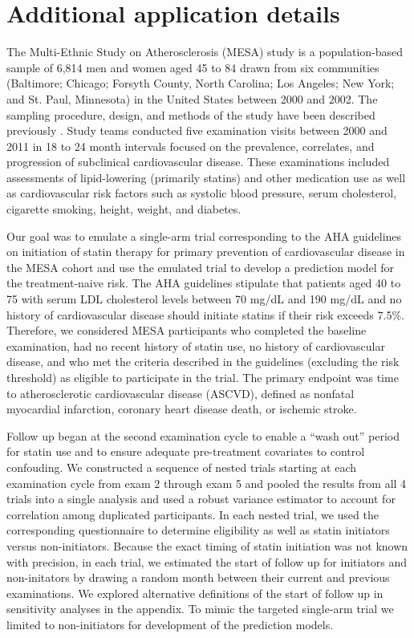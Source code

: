\section{Additional application details}
The Multi-Ethnic Study on Atherosclerosis (MESA) study is a population-based sample of 6,814 men and women aged 45 to 84 drawn from six communities (Baltimore; Chicago; Forsyth County, North Carolina; Los Angeles; New York; and St. Paul, Minnesota) in the United States between 2000 and 2002. The sampling procedure, design, and methods of the study have been described previously \cite{bild_multi-ethnic_2002}. Study teams conducted five examination visits between 2000 and 2011 in 18 to 24 month intervals focused on the prevalence, correlates, and progression of subclinical cardiovascular disease. These examinations included assessments of lipid-lowering (primarily statins) and other medication use as well as cardiovascular risk factors such as systolic blood pressure, serum cholesterol, cigarette smoking, height, weight, and diabetes. 

Our goal was to emulate a single-arm trial corresponding to the AHA guidelines on initiation of statin therapy for primary prevention of cardiovascular disease in the MESA cohort and use the emulated trial to develop a prediction model for the treatment-naive risk. The AHA guidelines stipulate that patients aged 40 to 75 with serum LDL cholesterol levels between 70 mg/dL and 190 mg/dL and no history of cardiovascular disease should initiate statins if their risk exceeds 7.5\%. Therefore, we considered MESA participants who completed the baseline examination, had no recent history of statin use, no history of cardiovascular disease, and who met the criteria described in the guidelines (excluding the risk threshold) as eligible to participate in the trial. The primary endpoint was time to atherosclerotic cardiovascular disease (ASCVD), defined as nonfatal myocardial infarction, coronary heart disease death, or ischemic stroke. 

Follow up began at the second examination cycle to enable a ``wash out'' period for statin use and to ensure adequate pre-treatment covariates to control confouding. We constructed a sequence of nested trials starting at each examination cycle from exam 2 through exam 5 and pooled the results from all 4 trials into a single analysis and used a robust variance estimator to account for correlation among duplicated participants. In each nested trial, we used the corresponding questionnaire to determine eligibility as well as statin initiators versus non-initiators. Because the exact timing of statin initiation was not known with precision, in each trial, we estimated the start of follow up for initiators and non-initators by drawing a random month between their current and previous examinations. We explored alternative definitions of the start of follow up in sensitivity analyses in the appendix. To mimic the targeted single-arm trial we limited to non-initiators for development of the prediction models.

